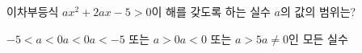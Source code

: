 이차부등식 $ax^2+2ax-5>0$이 해를 갖도록 하는 실수 $a$의 값의 범위는?
\begin{choicesii}{$-5<a<0$}{$a<0$}{$a<-5$ 또는 $a>0$}{$a<0$ 또는 $a>5$}{$a\ne 0$인 모든 실수}\end{choicesii}
